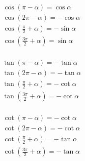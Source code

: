 \documentclass[a4paper, fleqn, fontset = mac]{ctexart}
\begin{document}
		\begin{minipage}{0.3\textwidth}
			\begin{align*}
			& \cos\left( \pi - \alpha \right) = \cos\alpha \\
			& \cos\left( 2\pi - \alpha \right) = -\cos\alpha \\
			& \cos\left( \frac\pi2 + \alpha \right) = -\sin\alpha \\
			& \cos\left( \frac{3\pi}2 + \alpha \right) = \sin\alpha \\
			\end{align*}
		\end{minipage}
		\begin{minipage}{0.3\textwidth}
			\begin{align*}
			& \tan\left( \pi - \alpha \right) = -\tan\alpha \\
			& \tan\left( 2\pi - \alpha \right) = -\tan\alpha \\
			& \tan\left( \frac\pi2 + \alpha \right) = -\cot\alpha \\
			& \tan\left( \frac{3\pi}2 + \alpha \right) = -\cot\alpha \\
			\end{align*}
		\end{minipage}
		\begin{minipage}{0.3\textwidth}
			\begin{align*}		
			& \cot\left( \pi - \alpha \right) = -\cot\alpha \\
			& \cot\left( 2\pi - \alpha \right) = -\cot\alpha \\
			& \cot\left( \frac\pi2 + \alpha \right) = -\tan\alpha \\
			& \cot\left( \frac{3\pi}2 + \alpha \right) = -\tan\alpha \\
			\end{align*}
		\end{minipage}
		
\end{document}
